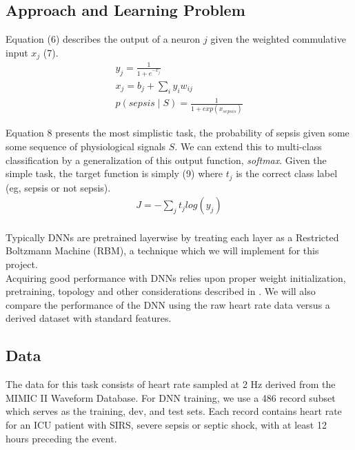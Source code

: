 \documentclass[12pt,solutions]{article}
\begin{document}
\subsection{Approach and Learning Problem}

Equation (6) describes
the output of a neuron $j$ given the weighted commulative input $x_j$ (7). 
\begin{align}
y_{j} = \frac{1}{1+e^{-x_{j}}} \\
x_{j} = b_{j} + \sum_{i}y_{i}w_{ij} \\
p(sepsis \mid S) = \frac{1}{1 + exp(x_{sepsis})}
\end{align}

Equation 8 presents the most simplistic task, the probability
of sepsis given some some sequence of physiological signals $S$. We can
extend this to multi-class classification by a generalization
of this output function, \textit{softmax}. Given the simple task, the 
target function is simply (9) where $t_{j}$ is the correct class label (eg, sepsis or not sepsis).
\begin{align}
J = -\sum_{j} t_{j} log(y_{j})
\end{align} \\

Typically DNNs are pretrained layerwise by treating each layer as a 
Restricted Boltzmann Machine (RBM), a technique which we will implement for this project. \\

Acquiring good performance with DNNs relies upon proper weight initialization, pretraining, topology and other considerations described in \cite{vesely2013sequence, hinton2012deep}. We will also compare the performance of the DNN using the raw heart rate data versus a derived dataset with standard features. 

\subsection{Data}

The data for this task consists of heart rate sampled at 2 Hz derived from the MIMIC II Waveform Database. For DNN training, we use a 486 record subset which 
serves as the training, dev, and test sets. 
Each record contains heart rate for an ICU patient with SIRS, severe sepsis or septic shock, with at least
12 hours preceding the event.




\end{document}
